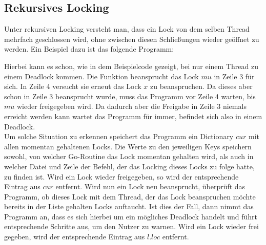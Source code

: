 \subsection{Rekursives Locking}\label{Kap::Rev:Recursive}
Unter rekursiven Locking versteht man, dass ein Lock von dem selben Thread 
mehrfach geschlossen wird, ohne zwischen diesen Schließungen wieder geöffnet zu
werden. Ein Beispiel dazu ist das folgende Programm:
\begin{figure}[H]
    
\end{figure}
Hierbei kann es schon, wie in dem Beispielcode gezeigt, bei nur einem Thread
zu einem Deadlock kommen. Die Funktion beansprucht das Lock $mu$ in Zeile $3$ 
für sich. In Zeile 4 versucht sie erneut das Lock $x$ zu beanspruchen. Da dieses
aber schon in Zeile 3 beansprucht wurde, muss das Programm vor Zeile 4 warten, 
bis $mu$ wieder freigegeben wird. Da dadurch aber die Freigabe in Zeile 3 
niemals erreicht werden kann wartet das Programm für immer, befindet sich also 
in einem Deadlock.\\
Um solche Situation zu erkennen speichert das Programm ein Dictionary $cur$ mit 
allen momentan gehaltenen 
Locks. Die Werte zu den jeweiligen Keys speichern sowohl, von welcher Go-Routine das 
Lock momentan gehalten wird, als auch in welcher Datei und Zeile der Befehl,
der das Locking dieses Locks zu folge hatte, zu finden ist. Wird ein Lock 
wieder freigegeben, so wird der entsprechende Eintrag aus $cur$ entfernt. 
Wird nun ein Lock neu beansprucht, überprüft 
das Programm, ob dieses Lock mit dem Thread, der das Lock beanspruchen möchte 
bereits in der Liste gehalten Locks auftaucht. Ist dies der Fall, dann nimmt das
Programm an, dass es sich hierbei um ein mögliches Deadlock handelt und führt 
entsprechende Schritte aus, um den Nutzer zu warnen. Wird ein Lock wieder frei
gegeben, wird der entsprechende Eintrag aus $l.loc$ entfernt.


